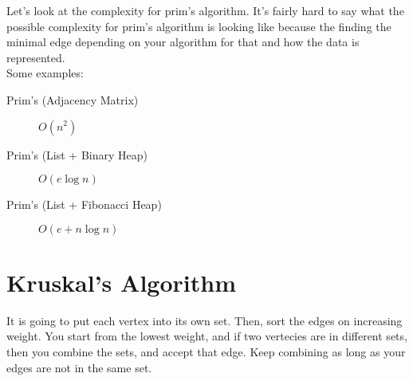 \documentclass{article}
\begin{document}
Let's look at the complexity for prim's algorithm. It's fairly hard to say what the possible complexity for prim's algorithm is looking like because the finding the minimal edge depending on your algorithm for that and how the data is represented.\\
Some examples:\\
\begin{description}
\item[{Prim's (Adjacency Matrix)}] \(O(n^2)\)
\item[{Prim's (List + Binary Heap)}] \(O(e \log n)\)
\item[{Prim's (List + Fibonacci Heap)}] \(O(e + n \log n)\)
\end{description}

\section{Kruskal's Algorithm}
\label{sec:org0388bb6}
It is going to put each vertex into its own set. Then, sort the edges on increasing weight. You start from the lowest weight, and if two vertecies are in different sets, then you combine the sets, and accept that edge. Keep combining as long as your edges are not in the same set.
\end{document}
